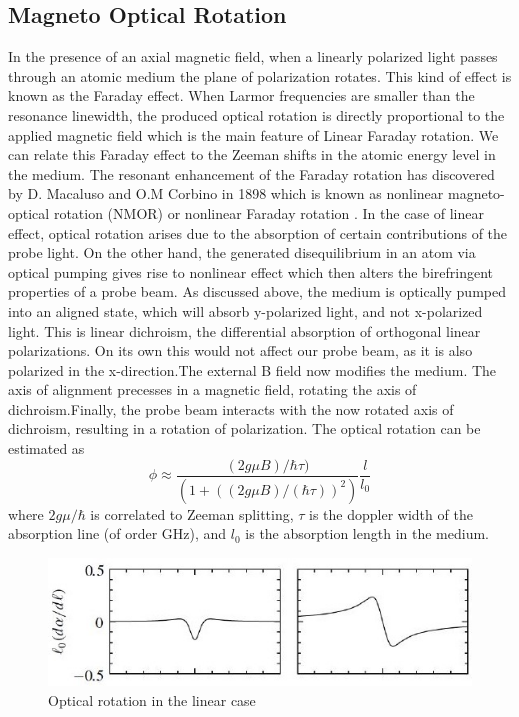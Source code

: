 \documentclass[12pt]{report}
\begin{document}
\subsection{Magneto Optical Rotation}
\bigskip
In the presence of an axial magnetic field, when a linearly polarized light passes through an atomic medium the plane of polarization rotates. This kind of effect is known as the Faraday effect. When Larmor frequencies are smaller than the resonance linewidth, the produced optical rotation is directly proportional to the applied magnetic field which is the main feature of Linear Faraday rotation. We can relate this Faraday effect to the Zeeman shifts in the atomic energy level in the medium. The resonant enhancement of the Faraday rotation has discovered by D. Macaluso and O.M Corbino in 1898 which is known as nonlinear magneto-optical rotation (NMOR) or nonlinear Faraday rotation \cite{budker2013optical}. In the case of linear effect, optical rotation arises due to the absorption of certain contributions of the probe light. On the other hand, the generated disequilibrium in an atom via optical pumping gives rise to nonlinear effect which then alters the birefringent properties of a probe beam. 
As discussed above, the medium is optically pumped into an aligned state, which will
absorb y-polarized light, and not x-polarized light. This is linear dichroism, the differential absorption of orthogonal linear polarizations. On its own this would not affect our probe beam, as it is also polarized in the x-direction.The external B field now modifies the medium. The axis of alignment precesses in a
magnetic field, rotating the axis of dichroism.Finally, the probe beam interacts with the now rotated axis of dichroism, resulting in a rotation of polarization.
The optical rotation can be estimated as
\begin{equation}
\phi \approx \frac{(2g\mu B)/ \hbar\tau)}{(1+((2g\mu B)/(\hbar\tau))^2 )}\frac{l}{l_0}
\end{equation}
where $2g\mu/\hbar$ is correlated to Zeeman splitting, $\tau$ is the doppler width of the
absorption line (of order GHz), and $l_0$ is the absorption length in the medium. 
\begin{figure}
\centering
\includegraphics[width=0.85\linewidth]{figures/faraday_rotation}
\caption{Optical rotation in the linear case\cite{auzinsh2010optically}}
\end{figure}
\end{document}
